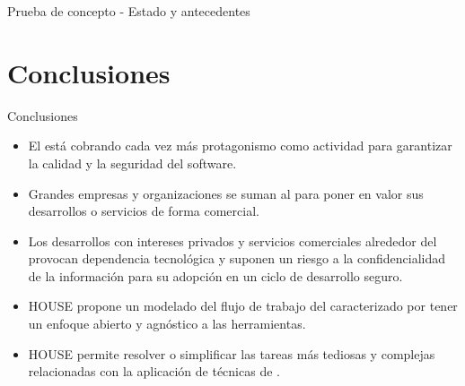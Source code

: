 \documentclass[aspectratio=169]{beamer}
\begin{document}
\begin{frame}{Prueba de concepto - Estado y antecedentes}
\end{frame}

\section{Conclusiones}
\frame{\sectionpage}

\begin{frame}{Conclusiones}

   \begin{itemize}
\item El {\fz} está cobrando cada vez más protagonismo como actividad para garantizar la calidad y la seguridad del software.
\item Grandes empresas y organizaciones se suman al {\fz} para poner en valor sus desarrollos o servicios de forma comercial.
\item Los desarrollos con intereses privados  y servicios comerciales  alrededor del {\fz} provocan dependencia tecnológica y suponen un riesgo a la confidencialidad de la información para su adopción en un ciclo de desarrollo seguro.
\item HOUSE propone un modelado del flujo de trabajo del {\fz} caracterizado por tener un enfoque abierto y agnóstico a las herramientas.
\item HOUSE permite resolver o simplificar las tareas más tediosas y complejas relacionadas con la aplicación de técnicas de {\fz}.
\end{itemize}

\end{frame}
\end{document}
